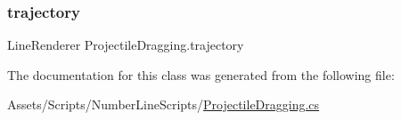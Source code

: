 \mbox{\label{classProjectileDragging_a2ab40fc38512c50f3ccbc00fb19aea4b}} 
\subsubsection{\texorpdfstring{trajectory}{trajectory}}
{\footnotesize\ttfamily Line\+Renderer Projectile\+Dragging.\+trajectory}



The documentation for this class was generated from the following file\+:\begin{DoxyCompactItemize}
\item 
Assets/\+Scripts/\+Number\+Line\+Scripts/\hyperlink{ProjectileDragging_8cs}{Projectile\+Dragging.\+cs}\end{DoxyCompactItemize}
